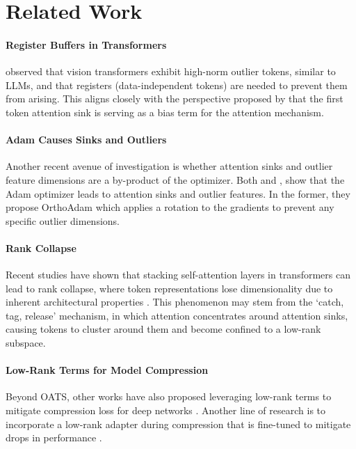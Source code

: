 \section{Related Work}
\paragraph{Register Buffers in Transformers} \citet{darcet2024vision} observed that vision transformers exhibit high-norm outlier tokens, similar to LLMs, and that registers (data-independent tokens) are needed to prevent them from arising. This aligns closely with the perspective proposed by \citet{sun2024massive, gu2024attention} that the first token attention sink is serving as a bias term for the attention mechanism.  
    \paragraph{Adam Causes Sinks and Outliers} Another recent avenue of investigation is whether attention sinks and outlier feature dimensions are a by-product of the optimizer. Both \citet{kaul2024attentionactivationunravellingenigmas} and \citet{guo2024activedormantattentionheadsmechanistically}, show that the Adam optimizer \citep{adam} leads to attention sinks and outlier features. In the former, they propose OrthoAdam which applies a rotation to the gradients to prevent any specific outlier dimensions. 
    \paragraph{Rank Collapse} Recent studies have shown that stacking self-attention layers in transformers can lead to rank collapse, where token representations lose dimensionality due to inherent architectural properties \citep{noci2022signalpropagationtransformerstheoretical, emergence-of-clusters-rigollet}. This phenomenon may stem from the `catch, tag, release' mechanism, in which attention concentrates around attention sinks, causing tokens to cluster around them and become confined to a low-rank subspace.
    \paragraph{Low-Rank Terms for Model Compression} Beyond OATS, other works have also proposed leveraging low-rank terms to mitigate compression loss for deep networks \citep{reconstruct_slr, mozaffari2024slimoneshotquantizedsparse, li2024svdquant}.  Another line of research is to incorporate a low-rank adapter during compression that is fine-tuned to mitigate drops in performance \citep{pmlr-v202-li23ap, zhang2023pruning, guo2024lqlora, zhao2024apt, mozaffari2025slopedoubleprunedsparseplus}.